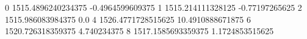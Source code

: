 0 1515.4896240234375 -0.4964599609375
1 1515.214111328125 -0.77197265625
2 1515.986083984375 0.0
4 1526.4771728515625 10.4910888671875
6 1520.726318359375 4.740234375
8 1517.1585693359375 1.1724853515625
